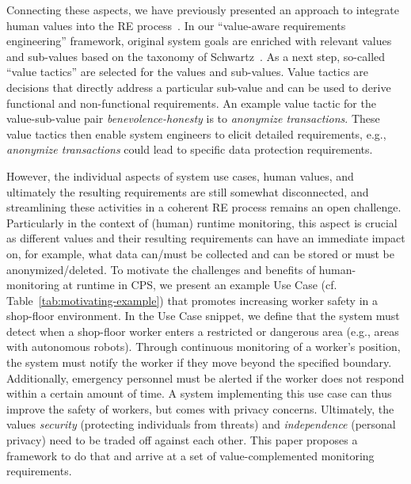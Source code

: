 Connecting these aspects, we have previously presented an approach to integrate human values into the RE process~\cite{wohlrab2024Supporting}.
In our \enquote{value-aware requirements engineering} framework, original system goals are enriched with relevant values and sub-values based on the taxonomy of Schwartz~\cite{schwartz1992Universals}.
As a next step, so-called \enquote{value tactics} are selected for the values and sub-values. Value tactics are decisions that directly address a particular sub-value and can be used to derive functional and non-functional requirements.
An example value tactic for the value-sub-value pair \textit{benevolence-honesty} is to \textit{anonymize transactions}. These value tactics then enable system engineers to elicit detailed requirements, e.g., \textit{anonymize transactions} could lead to specific data protection requirements.

However, the individual aspects of system use cases, human values, and ultimately the resulting requirements are still somewhat disconnected, and streamlining these activities in a coherent RE process remains an open challenge. Particularly in the context of (human) runtime monitoring, this aspect is crucial as different values and their resulting requirements can have an immediate impact on, for example, what data can/must be collected and can be stored or must be anonymized/deleted.
To motivate the challenges and benefits of human-monitoring at runtime in CPS, we present an example Use Case (cf. Table~\ref{tab:motivating-example}) that promotes increasing worker safety in a shop-floor environment.
In the Use Case snippet, we define that the system must detect when a shop-floor worker enters a restricted or dangerous area (e.g., areas with autonomous robots). %
Through continuous monitoring of a worker's position, the system must notify the worker if they move beyond the specified boundary. Additionally, emergency personnel must be alerted if the worker does not respond within a certain amount of time.
A system implementing this use case can thus improve the safety of workers, but comes with privacy concerns.
Ultimately, the values \textit{security} (protecting individuals from threats) and \textit{independence} (personal privacy) need to be traded off against each other.
This paper proposes a framework to do that and arrive at a set of value-complemented monitoring requirements.



